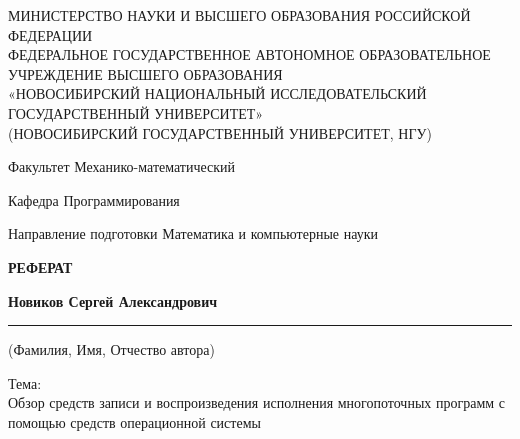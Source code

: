 \thispagestyle{empty}

\begin{center}
  МИНИСТЕРСТВО НАУКИ И ВЫСШЕГО ОБРАЗОВАНИЯ РОССИЙСКОЙ ФЕДЕРАЦИИ \\
  ФЕДЕРАЛЬНОЕ ГОСУДАРСТВЕННОЕ АВТОНОМНОЕ ОБРАЗОВАТЕЛЬНОЕ УЧРЕЖДЕНИЕ ВЫСШЕГО ОБРАЗОВАНИЯ \\
  «НОВОСИБИРСКИЙ НАЦИОНАЛЬНЫЙ ИССЛЕДОВАТЕЛЬСКИЙ ГОСУДАРСТВЕННЫЙ УНИВЕРСИТЕТ» \\
  (НОВОСИБИРСКИЙ ГОСУДАРСТВЕННЫЙ УНИВЕРСИТЕТ, НГУ)
\end{center}

\vspace{1.5cm}

\noindent %
Факультет \hfill Механико-математический \par

\vspace{1cm}

\noindent
Кафедра \hfill Программирования \par
\noindent
Направление подготовки \hfill Математика и компьютерные науки

\vspace{2cm}

\begin{center}
  \vspace{1em} %
  {\Large \textbf{РЕФЕРАТ}} %
  \vspace{1em} %
\end{center}


\begin{center}
  \textbf{Новиков Сергей Александрович}
  \rule[0.5ex]{\linewidth}{0.4pt}
  \small (Фамилия, Имя, Отчество автора)
\end{center}

\vspace{1.5cm}

\noindent Тема: \\ 
Обзор средств записи и воспроизведения исполнения многопоточных программ с помощью средств операционной системы

\vspace{1.5cm}

